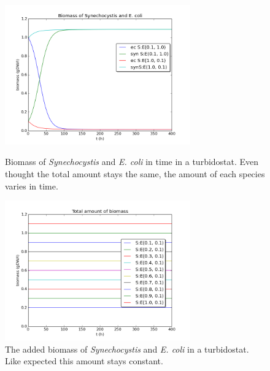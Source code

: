 \documentclass[10pt]{report}
\begin{document}
\begin{figure}[htbp]
  \hfill
  \begin{minipage}[t]{.45\textwidth}
 \begin{center}  
     \includegraphics[width=8cm]{sub_dependent_turb_biomassex.png}
     \caption{Biomass of \textit{Synechocystis} and \textit{E. coli} in time in a turbidostat. Even thought the total amount stays the same, the amount of each species varies in time.}
    \label{fig:subturbbex}
    \end{center}
  \end{minipage}
  \hfill
  \begin{minipage}[t]{.45\textwidth}
    \begin{center}  
     \includegraphics[width=8cm]{total_biomass1.png}
     \caption{The added biomass of \textit{Synechocystis} and \textit{E. coli} in a turbidostat. Like expected this amount stays constant.}
    \label{fig:subturbtb}
    \end{center}
  \end{minipage}
  \hfill
\end{figure}

\end{document}
